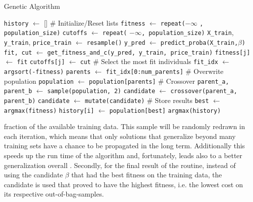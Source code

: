 \begin{algorithm}
\tiny
\caption{Genetic Algorithm}
\label{GA}
\begin{algorithmic}
\State \texttt{history} $\gets$ []
    \State \# Initialize/Reset lists
    \State \texttt{fitness} $\gets$ \texttt{repeat(}$-\infty$ \texttt{, population\_size)}
    \State \texttt{cutoffs} $\gets$ \texttt{repeat(} $-\infty$\texttt{, population\_size)}
        \State \texttt{X\_train}, \texttt{y\_train}, \texttt{price\_train} $\gets$ \texttt{resample()}
    \EndIf   
        \State \texttt{y\_pred} $\gets$ \texttt{predict\_proba(X\_train,}$\beta$\texttt{)}
        \State \texttt{fit, cut} $\gets$ \texttt{get\_fitness\_and\_c(y\_pred, y\_train, price\_train)}
        \State \texttt{fitness[j]} $\gets$ \texttt{fit}
        \State \texttt{cutoffs[j]} $\gets$ \texttt{cut}
    \EndFor
    \State \# Select the most fit individuals
    \State \texttt{fit\_idx} $\gets$ \texttt{argsort(-fitness)}
    \State \texttt{parents} $\gets$ \texttt{fit\_idx[0:num\_parents]}
    \State \# Overwrite population
    \State \texttt{population} $\gets$ \texttt{population[parents]}
    \State \# Crossover
        \State \texttt{parent\_a, parent\_b} $\gets$ \texttt{sample(population, 2)}
        \State \texttt{candidate} $\gets$ \texttt{crossover(parent\_a, parent\_b)}
            \State \texttt{candidate} $\gets$ \texttt{mutate(candidate)}
        \EndIf
    \EndWhile
    \State \# Store results
    \State \texttt{best} $\gets$ \texttt{argmax(fitness)}
    \State \texttt{history[i]} $\gets$ \texttt{population[best]}
\EndFor
\State \Return \texttt{argmax(history)}
\end{algorithmic}
\end{algorithm}



\noindent fraction of the available training data. This sample will be randomly redrawn in each iteration, which means that only solutions that generalize beyond many training sets have a chance to be propagated in the long term. Additionally this speeds up the run time of the algorithm and, fortunately, leads also to a better generalization overall \cite{garst}. Secondly, for the final result of the routine, instead of using the candidate $\beta$ that had the best fitness on the training data, the candidate is used that proved to have the highest fitness, i.e. the lowest cost on its respective out-of-bag-samples.

